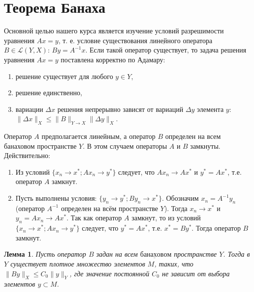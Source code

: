 \documentclass[12pt,a4paper,titlepage,oneside]{book}
\theoremstyle{definition}
\theoremstyle{plain}
\theoremstyle{break}
\theoremstyle{remark}
\theoremstyle{remark}
\theoremstyle{remark}
\theoremstyle{remark}
\theoremstyle{plain}
\newtheorem*{lemma}{Лемма}
\theoremstyle{plain}
\begin{document}
\section{Теорема Банаха}
Основной целью нашего курса является изучение условий разрешимости уравнения $Ax=y$, т. е. условие существования $\underbar {линейного}$ оператора $B\in \mathcal{L}(Y, X)$: $By=A^{-1}x$. Если такой оператор существует, то задача решения уравнения $Ax=y$ поставлена корректно по Адамару:
\begin{enumerate}
	\item решение существует для любого $y \in Y$,
	\item решение единственно,
	\item вариации $\Delta x$ решения непрерывно зависят от вариаций $\Delta y$ элемента $y$: $\lVert \Delta x\rVert_X \leqslant \lVert B\rVert_{Y\to X}\lVert \Delta y\rVert_X$.
\end{enumerate}
Оператор $A$ предполагается линейным, а оператор $B$ определен на всем банаховом пространстве $Y$. В этом случаем операторы $A$ и $B$ замкнуты. Действительно:
\begin{enumerate}

	\item Из условий $\{x_n \to x^{*};Ax_n \to y^{*}\}$ следует, что $Ax_n \to Ax^{*}$ и $y^{*}=Ax^{*}$, т.е. оператор $A$ замкнут.

	\item Пусть выполнены условия: $\{y_n \to y^{*}; By_n \to x^{*}\}$. Обозначим $x_n=A^{-1}y_n$ (оператор $A^{-1}$ определен на всём пространстве $Y$). Тогда $x_n \to x^{*}$ и $y_n=Ax_n \to Ax^{*}$. Так как оператор $A$ замкнут, то из условий $\{x_n \to x^{*};Ax_n \to y^{*}\}$ следует, что $y^{*}=Ax^{*}$, т.е. $x^{*}=By^{*}$. Тогда оператор $B$ замкнут.
	
\end{enumerate}
	
\begin{lemma}
Пусть оператор $B$ задан на всем $\underbar {банаховом}$ пространстве $Y$. Тогда в $Y$ существует плотное множество элементов $M$, таких, что $\lVert By\rVert_X \leqslant C_0\lVert y\rVert_Y $, где значение постоянной $C_0$ не зависит от выбора элементов $y \subset M$.
\end{lemma}
\end{document}
